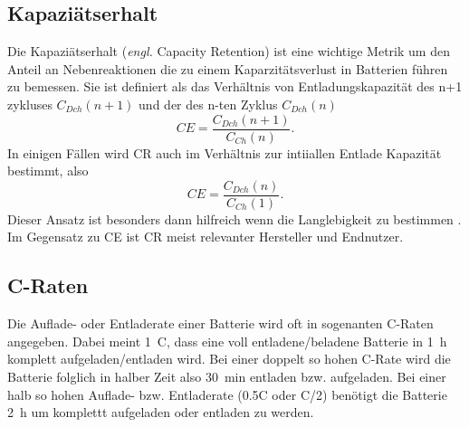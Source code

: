 \subsection{Kapaziätserhalt}
Die Kapaziätserhalt (\textit{engl.} Capacity Retention) ist eine wichtige Metrik um den Anteil an Nebenreaktionen die zu einem Kaparzitätsverlust in Batterien führen zu bemessen. Sie ist definiert als das Verhältnis von Entladungskapazität des n+1 zykluses $C_{Dch}(n+1)$ und der des n-ten Zyklus $C_{Dch}(n)$ 
\begin{equation}
    CE = \frac{C_{Dch}(n+1)}{C_{Ch}(n)}.
\end{equation}
In einigen Fällen wird CR auch im Verhältnis zur intiiallen Entlade Kapazität bestimmt, also
\begin{equation}
    CE = \frac{C_{Dch}(n)}{C_{Ch}(1)}.
\end{equation}
Dieser Ansatz ist besonders dann hilfreich wenn die Langlebigkeit zu bestimmen \cite{Tornheim2020}.
Im Gegensatz zu CE ist CR meist relevanter Hersteller und Endnutzer.

\subsection{C-Raten}
Die Auflade- oder Entladerate einer Batterie wird oft in sogenanten C-Raten angegeben. Dabei meint 1~C, dass eine voll entladene/beladene Batterie in 1~h komplett aufgeladen/entladen wird. Bei einer doppelt so hohen C-Rate wird die Batterie folglich in halber Zeit also 30~min entladen bzw. aufgeladen. Bei einer halb so hohen Auflade- bzw. Entladerate (0.5C oder C/2) benötigt die Batterie 2~h um komplettt aufgeladen oder entladen zu werden.